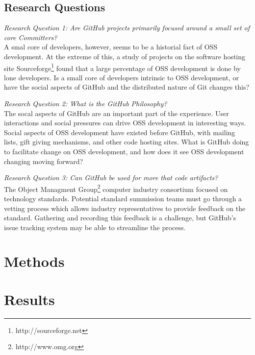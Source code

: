 \documentclass{proc}
\begin{document}
\subsection{Research Questions}

\emph{Research Question 1: Are GitHub projects primarily focused around a small set of core Committers?}\\
A smal core of developers, however, seems to be a historial fact of OSS development\cite{mockus2000case,mockus2000two,krishnamurthy2002cave}. At the extreme of this, a study of projects on the software hosting site Sourceforge\footnote{http://sourceforge.net} found that a large percentage of OSS development is done by lone developers. Is a small core of developers intrinsic to OSS development, or have the social aspects of GitHub and the distributed nature of Git changes this?

\emph{Research Question 2: What is the GitHub Philosophy?}\\
The socal aspects of GitHub are an important part of the experience\cite{dabbish2012social}. User interactions and social pressures can drive OSS development in interesting ways. Social aspects of OSS development have existed before GitHub, with mailing lists\cite{mockus2000case}, gift giving mechanisms\cite{bergquist2008power}, and other code hosting sites. What is GitHub doing to facilitate change on OSS development, and how does it see OSS development changing moving forward?

\emph{Research Question 3: Can GitHub be used for more that code artifacts?}\\
The Object Managment Group\textregistered\footnote{http://www.omg.org} computer industry consortium focused on technology standards. Potential standard summission teams must go through a vetting process\cite{kobryn1999uml} which allows industry representatives to provide feedback on the standard. Gathering and recording this feedback is a challenge, but GitHub's issue tracking system may be able to streamline the process.

\section{Methods}

\section{Results}
\end{document}
